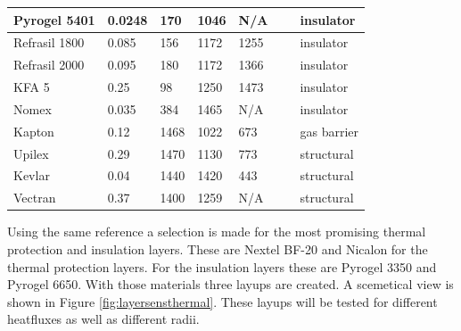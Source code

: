\begin{table}[ht]
\begin{tabular}{|l|l|l|l|l|l|l|}
		Pyrogel 5401      & 0.0248                                                & 170                                        & 1046                                            & N/A  	 & ~          & insulator                                 \\ \hline
		Refrasil 1800      & 0.085                                                 & 156                                        & 1172                                            & 1255 	 & ~           & insulator                                \\ \hline
		Refrasil 2000      & 0.095                                                 & 180                                        & 1172                                            & 1366 	 & ~            & insulator                               \\ \hline
		KFA 5             & 0.25                                                  & 98                                         & 1250                                            & 1473 	 & ~        & insulator                                   \\ \hline
		Nomex             & 0.035                                                  & 384                                         & 1465                                            & N/A 	 & ~        & insulator                                   \\ \hline
		Kapton            & 0.12                                                  & 1468                                       & 1022                                            & 673	 & ~            & gas barrier                              \\ \hline
		Upilex            & 0.29                                                  & 1470                                       & 1130                                            & 773 	 & ~             & structural                            \\ \hline
		Kevlar            & 0.04 & 1440                                       & 1420                                            & 443 	 & ~             & structural                            \\ \hline
		Vectran            & 0.37 & 1400 & 1259 & N/A 	 &  & structural                            \\ \hline
	\end{tabular}
	\label{tab:tpsmatprop}
\end{table}

Using the same reference a selection is made for the most promising thermal protection and insulation layers. These are Nextel BF-20 and Nicalon for the thermal protection layers. For the insulation layers these are Pyrogel 3350 and Pyrogel 6650. With those materials three layups are created. A scemetical view is shown in Figure \ref{fig:layersensthermal}. These layups will be tested for different heatfluxes as well as different radii.


